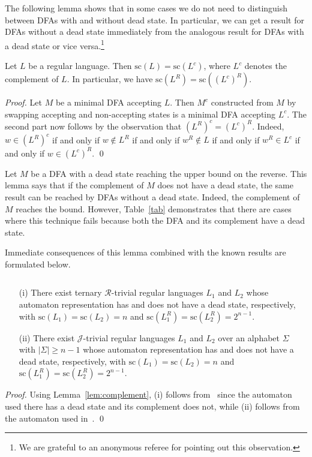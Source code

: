 \documentclass[runningheads]{llncs}
\newcommand{\R}{$\mathcal{R}$}
\newcommand{\J}{$\mathcal{J}$}
\renewcommand{\sc}{\mathrm{sc}}
\begin{document}
  The following lemma shows that in some cases we do not need to distinguish between DFAs with and without dead state. In particular, we can get a result for DFAs without a dead state immediately from the analogous result for DFAs with a dead state or vice versa.\footnote{We are grateful to an anonymous referee for pointing out this observation.} 
  \begin{lemma}\label{lem:complement}
    Let $L$ be a regular language. Then $\sc(L)=\sc(L^c)$, where $L^c$ denotes the complement of $L$. 
    In particular, we have $\sc(L^R)=\sc((L^c)^R)$.
  \end{lemma}
\begin{proof}
    Let $M$ be a minimal DFA accepting $L$. Then $M^c$ constructed from $M$ by swapping accepting and non-accepting states is a minimal DFA accepting $L^c$. The second part now follows by the observation that $(L^R)^c=(L^c)^R$. 
    Indeed, $w\in (L^R)^c$ if and only if $w\notin L^R$ if and only if $w^R\notin L$ if and only if $w^R\in L^c$ if and only if $w\in (L^c)^R$.
    \qed
  \end{proof}


  Let $M$ be a DFA with a dead state reaching the upper bound on the reverse. This lemma says that if the complement of $M$ does not have a dead state, the same result can be reached by DFAs without a dead state. Indeed, the complement of $M$ reaches the bound. However, Table~\ref{tab} demonstrates that there are cases where this technique fails because both the DFA and its complement have a dead state. 
  
  Immediate consequences of this lemma combined with the known results are formulated below.
  \begin{corollary}\label{cor:bound}$ $
    \begin{itemize}
      \item[(i)] There exist ternary \R-trivial regular languages $L_1$ and $L_2$ whose automaton representation has and does not have a dead state, respectively, with $\sc(L_1)=\sc(L_2)=n$ and $\sc(L_1^R)=\sc(L_2^R)=2^{n-1}$. 
      \item[(ii)] There exist \J-trivial regular languages $L_1$ and $L_2$ over an alphabet $\Sigma$ with $|\Sigma|\ge n-1$ whose automaton representation has and does not have a dead state, respectively, with $\sc(L_1)=\sc(L_2)=n$ and $\sc(L_1^R)=\sc(L_2^R)=2^{n-1}$.
    \end{itemize}
  \end{corollary}
  \begin{proof}
    Using Lemma~\ref{lem:complement},
    (i) follows from~\cite[Lemma~3, p.~232]{ciaa2012} since the automaton used there has a dead state and its complement does not,
    while (ii) follows from the automaton used in~\cite[Theorem~5, p.~15]{BrArXiv12}.
  \qed
  \end{proof}
\end{document}
